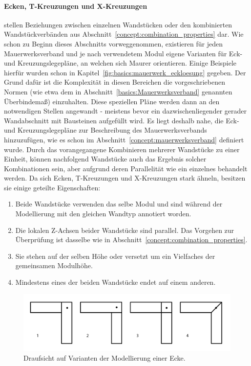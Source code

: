 \paragraph*{Ecken, T-Kreuzungen und X-Kreuzungen}\label{concept:corner_etc_properties} stellen Beziehungen zwischen einzelnen Wandstücken oder den kombinierten Wandstückverbänden aus Abschnitt~\ref{concept:combination_properties} dar.
Wie schon zu Beginn dieses Abschnitts vorweggenommen, existieren für jeden Mauerwerksverband und je nach verwendetem Modul eigene Varianten für Eck- und Kreuzungslegepläne, an welchen sich Maurer orientieren.
Einige Beispiele hierfür wurden schon in Kapitel~\ref{fig:basics:mauerwerk_eckloesung} gegeben.
Der Grund dafür ist die Komplexität in diesen Bereichen die vorgeschriebenen Normen (wie etwa dem in Abschnitt~\ref{basics:Mauerwerksverband} genannten Überbindemaß) einzuhalten.
Diese speziellen Pläne werden dann an den notwendigen Stellen angewandt - meistens bevor ein dazwischenliegender gerader Wandabschnitt mit Bausteinen aufgefüllt wird.
Es liegt deshalb nahe, die Eck- und Kreuzungslegepläne zur Beschreibung des Mauerwerksverbands hinzuzufügen, wie es schon im Abschnitt~\ref{concept:mauerwerksverband} definiert wurde.
Durch das vorangegangene Kombinieren mehrerer Wandstücke zu einer Einheit, können nachfolgend Wandstücke auch das Ergebnis solcher Kombinationen sein, aber aufgrund deren Parallelität wie ein einzelnes behandelt werden.
Da sich Ecken, T-Kreuzungen und X-Kreuzungen stark ähneln, besitzen sie einige geteilte Eigenschaften:
\begin{enumerate}
    \item\label{concept:tmp1} Beide Wandstücke verwenden das selbe Modul und sind während der Modellierung mit den gleichen Wandtyp annotiert worden.
    \item Die lokalen Z-Achsen beider Wandstücke sind parallel. Das Vorgehen zur Überprüfung ist dasselbe wie in Abschnitt~\ref{concept:combination_properties}.
    \item Sie stehen auf der selben Höhe oder versetzt um ein Vielfaches der gemeinsamen Modulhöhe.
    \item\label{concept:tmp4} Mindestens eines der beiden Wandstücke endet auf einem anderen.
\end{enumerate}

\begin{figure}[ht]
    \centering
    \includegraphics[width=0.8\columnwidth]{fig/ecken_variationen.png}
    \caption{Draufsicht auf Varianten der Modellierung einer Ecke.}
    \label{fig:concept:ecken_variationen}
\end{figure}

